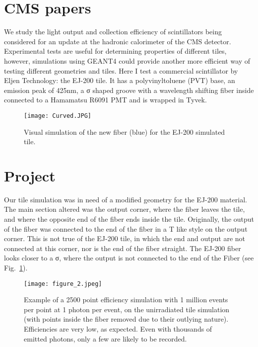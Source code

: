 \documentclass[11pt,twoside,a4paper,dn,final]{cms-tdr}
\begin{document}

\section{CMS papers}
We study the light output and collection efficiency of scintillators being considered for an update at the hadronic calorimeter of the CMS detector. Experimental tests are useful for determining properties of different tiles, however, simulations using GEANT4 could provide another more efficient way of testing different geometries and tiles. Here I test a commercial scintillator by Eljen Technology: the EJ-200 tile. It has a polyvinyltoluene (PVT) base, an emission peak of 425nm, a σ shaped groove with a wavelength shifting fiber inside connected to a Hamamatsu R6091 PMT and is wrapped in Tyvek.

\begin{figure}[h!]
  \begin{center}
    \texttt{[image: Curved.JPG]}
    \caption{Visual simulation of the new fiber (blue) for the EJ-200 simulated tile.}
    \label{fig:1}
  \end{center}
\end{figure}

\section{Project}
	Our tile simulation was in need of a modified geometry for the EJ-200 material. The main section altered was the output corner, where the fiber leaves the tile, and where the opposite end of the fiber ends inside the tile. Originally, the output of the fiber was connected to the end of the fiber in a T like style on the output corner. This is not true of the EJ-200 tile, in which the end and output are not connected at this corner, nor is the end of the fiber straight. The EJ-200 fiber looks closer to a σ, where the output is not connected to the end of the Fiber (see Fig.~\ref{fig:1}). 

\begin{figure}[h!]
  \begin{center}
    \texttt{[image: figure\_2.jpeg]}
    \caption{Example of a 2500 point efficiency simulation with 1 million events per point at 1 photon per event, on the unirradiated tile simulation (with points inside the fiber removed due to their outlying nature). Efficiencies are very low, as expected. Even with thousands of emitted photons, only a few are likely to be recorded.}
    \label{fig:2}
  \end{center}
\end{figure}
\end{document}
